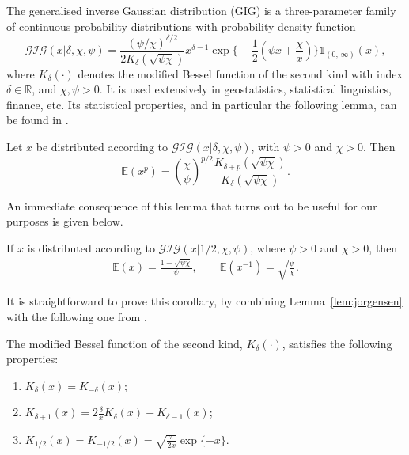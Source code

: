 The generalised inverse Gaussian distribution (GIG) is a three-parameter family of continuous probability distributions with probability density function
\begin{equation}
	\mathcal{GIG}(x|\delta, \chi, \psi)
	= \frac{(\psi/\chi)^{\delta/2}}{2K_{\delta}(\sqrt{\psi\chi})}x^{\delta-1}\exp\Big\{-\frac{1}{2}\left(\psi x + \frac{\chi}{x}\right)\Big\}\mathds{1}_{(0,\, \infty)}(x),
\end{equation}
where $K_{\delta}(\cdot)$ denotes the modified Bessel function of the second kind with index $\delta \in \mathbb{R}$, and $\chi, \psi > 0$. It is used extensively in geostatistics, statistical linguistics, finance, etc. Its statistical properties, and in particular the following lemma, can be found in \citep{jorgensen82}.
\begin{lemma}
\label{lem:jorgensen}
Let $x$ be distributed according to $\mathcal{GIG}(x|\delta, \chi, \psi)$, with $\psi > 0$ and $\chi > 0$. Then
\begin{equation}
	\mathbb{E}(x^p)
	= \left(\frac{\chi}{\psi}\right)^{p/2}\frac{K_{\delta+p}(\sqrt{\psi\chi})}{K_{\delta}(\sqrt{\psi\chi})}.
\end{equation}
\end{lemma}
An immediate consequence of this lemma that turns out to be useful for our purposes is given below. 
\begin{corollary}
\label{cor:jorgensen}
If $x$ is distributed according to $\mathcal{GIG}(x|1/2, \chi, \psi)$, where $\psi > 0$ and $\chi > 0$, then
\begin{align}
	\mathbb{E}(x)
	= \frac{1 + \sqrt{\psi\chi}}{\psi},
	\qquad
	\mathbb{E}(x^{-1})
	= \sqrt{\frac{\psi}{\chi}}.
\end{align}
\end{corollary}
It is straightforward to prove this corollary, by combining Lemma~\ref{lem:jorgensen} with the following one from \citep{abramowitz}.
\begin{lemma}
\label{lem:abramowitz}
The modified Bessel function of the second kind, $K_{\delta}(\cdot)$, satisfies the following properties:
\begin{enumerate}
	\item $K_{\delta}(x) = K_{-\delta}(x)$;
	\item $K_{\delta+1}(x) = 2\frac{\delta}{x}K_{\delta}(x) + K_{\delta-1}(x)$;
	\item $K_{1/2}(x) = K_{-1/2}(x) = \sqrt{\frac{\pi}{2x}}\exp\{-x\}$.
\end{enumerate}
\end{lemma}

